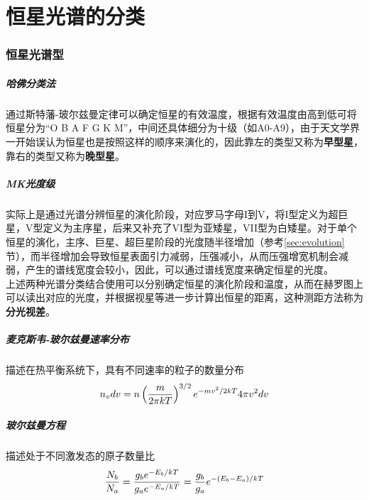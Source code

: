 \chapter{恒星光谱的分类}
\subsection{恒星光谱型}
\paragraph{哈佛分类法}
通过斯特藩-玻尔兹曼定律可以确定恒星的有效温度，根据有效温度由高到低可将恒星分为``O B A F G K M''，中间还具体细分为十级（如A0-A9），由于天文学界一开始误认为恒星也是按照这样的顺序来演化的，因此靠左的类型又称为\textbf{早型星}，靠右的类型又称为\textbf{晚型星}。

\paragraph{MK光度级}
实际上是通过光谱分辨恒星的演化阶段，对应罗马字母I到V，将I型定义为超巨星，V型定义为主序星，后来又补充了VI型为亚矮星，VII型为白矮星。对于单个恒星的演化，主序、巨星、超巨星阶段的光度随半径增加（参考\ref{sec:evolution}节），而半径增加会导致恒星表面引力减弱，压强减小，从而压强增宽机制会减弱，产生的谱线宽度会较小，因此，可以通过谱线宽度来确定恒星的光度。\mbox{}\\

上述两种光谱分类结合使用可以分别确定恒星的演化阶段和温度，从而在赫罗图上可以读出对应的光度，并根据视星等进一步计算出恒星的距离，这种测距方法称为\textbf{分光视差}。

\paragraph{麦克斯韦-玻尔兹曼速率分布}
描述在热平衡系统下，具有不同速率的粒子的数量分布
\begin{equation}
  n_v dv=n\left({m\over 2\pi k T}\right)^{3/2}e^{-mv^2/2kT}4\pi v^2 dv
  \label{eq:maxwell}
\end{equation}

\paragraph{玻尔兹曼方程}
描述处于不同激发态的原子数量比
\begin{equation}
  {N_b\over N_a}={g_b e^{-E_b/kT}\over g_a e^{-E_a/kT}}={g_b\over g_a}e^{-(E_b-E_a)/kT}
  \label{eq:boltzmann}
\end{equation}

